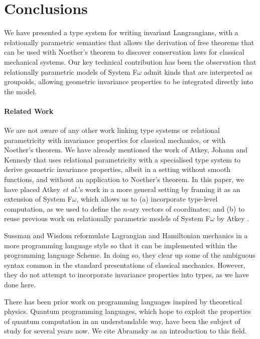 \documentclass{sigplanconf}
\theoremstyle{examplestyle}
\begin{document}
\section{Conclusions}
\label{sec:conclusions}

We have presented a type system for writing invariant Langrangians,
with a relationally parametric semantics that allows the derivation of
free theorems that can be used with Noether's theorem to discover
conservation laws for classical mechanical systems. Our key technical
contribution has been the observation that relationally parametric
models of System F$\omega$ admit kinds that are interpreted as
groupoids, allowing geometric invariance properties to be integrated
directly into the model.

\paragraph{Related Work} We are not aware of any other work linking
type systems or relational parametricity with invariance properties
for classical mechanics, or with Noether's theorem. We have already
mentioned the work of Atkey, Johann and Kennedy
\cite{atkey13abstraction} that uses relational parametricity with a
specialised type system to derive geometric invariance properties,
albeit in a setting without smooth functions, and without an
application to Noether's theorem. In this paper, we have placed Atkey
\emph{et al.}'s work in a more general setting by framing it as an
extension of System F$\omega$, which allows us to (a) incorporate
type-level computation, as we used to define the $n$-ary vectors of
coordinates; and (b) to reuse previous work on relationally parametric
models of System F$\omega$ by Atkey \cite{atkey12relational}.

Sussman and Wisdom \cite{sussman01structure} reformulate Lagrangian
and Hamiltonian mechanics in a more programming language style so that
it can be implemented within the programming language Scheme. In doing
so, they clear up some of the ambiguous syntax common in the standard
presentations of classical mechanics. However, they do not attempt to
incorporate invariance properties into types, as we have done here.

There has been prior work on programming languages inspired by
theoretical physics. Quantum programming languages, which hope to
exploit the properties of quantum computation in an understandable
way, have been the subject of study for several years now. We cite
Abramsky \cite{abramsky04} as an introduction to this field.
\end{document}
